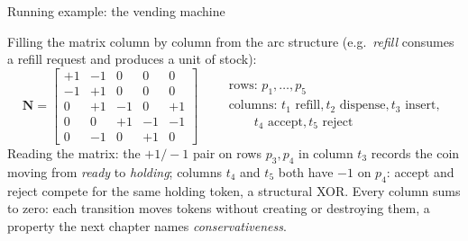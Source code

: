 \begin{examplebox}{Running example: the vending machine}
\begin{center}
\begin{tikzpicture}
\end{tikzpicture}
\end{center}
Filling the matrix column by column from the arc structure (e.g.\ \emph{refill} consumes a refill request and produces a unit of stock):
\[
\mathbf{N} = \begin{bmatrix}
+1 & -1 & 0 & 0 & 0 \\
-1 & +1 & 0 & 0 & 0 \\
 0 & +1 & -1 & 0 & +1 \\
 0 &  0 & +1 & -1 & -1 \\
 0 & -1 & 0 & +1 & 0
\end{bmatrix}
\qquad
\begin{array}{l}
\text{rows: } p_1, \ldots, p_5 \\
\text{columns: } t_1 \text{ refill}, t_2 \text{ dispense}, t_3 \text{ insert}, \\
\qquad t_4 \text{ accept}, t_5 \text{ reject}
\end{array}
\]
Reading the matrix: the $+1/-1$ pair on rows $p_3, p_4$ in column $t_3$ records the coin moving from \emph{ready} to \emph{holding}; columns $t_4$ and $t_5$ both have $-1$ on $p_4$: accept and reject compete for the same holding token, a structural XOR. Every column sums to zero: each transition moves tokens without creating or destroying them, a property the next chapter names \emph{conservativeness}.
\end{examplebox}

